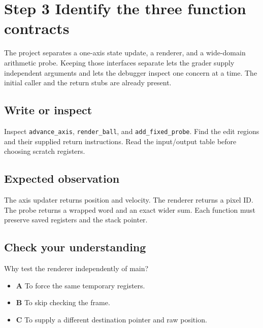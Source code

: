 \section{Step 3 Identify the three function contracts}\label{ball-s03}

The project separates a one-axis state update, a renderer, and a wide-domain arithmetic probe. Keeping those interfaces separate lets the grader supply independent arguments and lets the debugger inspect one concern at a time. The initial caller and the return stubs are already present.

\subsection{Write or inspect}
Inspect \texttt{advance\_axis}, \texttt{render\_ball}, and \texttt{add\_fixed\_probe}. Find the edit regions and their supplied return instructions. Read the input/output table before choosing scratch registers.

\subsection{Expected observation}
The axis updater returns position and velocity. The renderer returns a pixel ID. The probe returns a wrapped word and an exact wider sum. Each function must preserve saved registers and the stack pointer.

\subsection{Check your understanding}
Why test the renderer independently of main?

\begin{itemize}
  \item \textbf{A} To force the same temporary registers.
  \item \textbf{B} To skip checking the frame.
  \item \textbf{C} To supply a different destination pointer and raw position.
\end{itemize}
